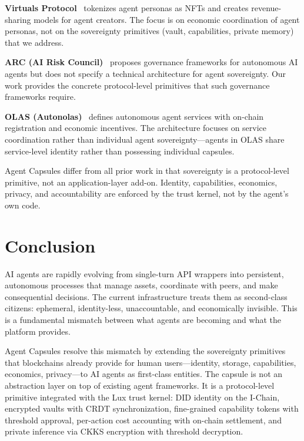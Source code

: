 \documentclass[11pt,a4paper]{article}
\begin{document}
\textbf{Virtuals Protocol}~\cite{virtuals2024} tokenizes agent personas as NFTs and creates revenue-sharing models for agent creators. The focus is on economic coordination of agent personas, not on the sovereignty primitives (vault, capabilities, private memory) that we address.

\textbf{ARC (AI Risk Council)}~\cite{arc2024} proposes governance frameworks for autonomous AI agents but does not specify a technical architecture for agent sovereignty. Our work provides the concrete protocol-level primitives that such governance frameworks require.

\textbf{OLAS (Autonolas)}~\cite{olas2023} defines autonomous agent services with on-chain registration and economic incentives. The architecture focuses on service coordination rather than individual agent sovereignty---agents in OLAS share service-level identity rather than possessing individual capsules.

Agent Capsules differ from all prior work in that sovereignty is a protocol-level primitive, not an application-layer add-on. Identity, capabilities, economics, privacy, and accountability are enforced by the trust kernel, not by the agent's own code.

\section{Conclusion}\label{sec:conclusion}

AI agents are rapidly evolving from single-turn API wrappers into persistent, autonomous processes that manage assets, coordinate with peers, and make consequential decisions. The current infrastructure treats them as second-class citizens: ephemeral, identity-less, unaccountable, and economically invisible. This is a fundamental mismatch between what agents are becoming and what the platform provides.

Agent Capsules resolve this mismatch by extending the sovereignty primitives that blockchains already provide for human users---identity, storage, capabilities, economics, privacy---to AI agents as first-class entities. The capsule is not an abstraction layer on top of existing agent frameworks. It is a protocol-level primitive integrated with the Lux trust kernel: DID identity on the I-Chain, encrypted vaults with CRDT synchronization, fine-grained capability tokens with threshold approval, per-action cost accounting with on-chain settlement, and private inference via CKKS encryption with threshold decryption.
\end{document}

